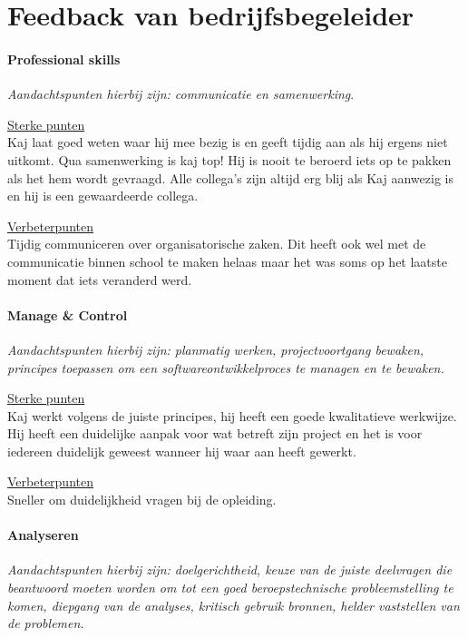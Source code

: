 \chapter{Feedback van bedrijfsbegeleider}

\label{FeedbackVanBedrijfsbegeleider} 

\subsubsection{Professional skills}
\textit{Aandachtspunten hierbij zijn: communicatie en samenwerking}.

\underline{Sterke punten}\\[0.1cm]
Kaj laat goed weten waar hij mee bezig is en geeft tijdig aan als hij ergens niet uitkomt. Qua samenwerking is kaj top! Hij is nooit te beroerd iets op te pakken als het hem wordt gevraagd. Alle collega’s zijn altijd erg blij als Kaj aanwezig is en hij is een gewaardeerde collega.

\underline{Verbeterpunten}\\[0.1cm]
Tijdig communiceren over organisatorische zaken. Dit heeft ook wel met de communicatie binnen school te maken helaas maar het was soms op het laatste moment dat iets veranderd werd.


\subsubsection{Manage \& Control}
\textit{Aandachtspunten hierbij zijn: planmatig werken, projectvoortgang bewaken, principes toepassen om een softwareontwikkelproces te managen en te bewaken.}

\underline{Sterke punten}\\[0.1cm]
Kaj werkt volgens de juiste principes, hij heeft een goede kwalitatieve werkwijze. Hij heeft een duidelijke aanpak voor wat betreft zijn project en het is voor iedereen duidelijk geweest wanneer hij waar aan heeft gewerkt.

\underline{Verbeterpunten}\\[0.1cm]
Sneller om duidelijkheid vragen bij de opleiding.


\subsubsection{Analyseren}
\textit{Aandachtspunten hierbij zijn: doelgerichtheid, keuze van de juiste deelvragen die beantwoord moeten worden om tot een goed beroepstechnische probleemstelling  te komen, diepgang van de analyses, kritisch gebruik bronnen, helder vaststellen van de problemen.}

